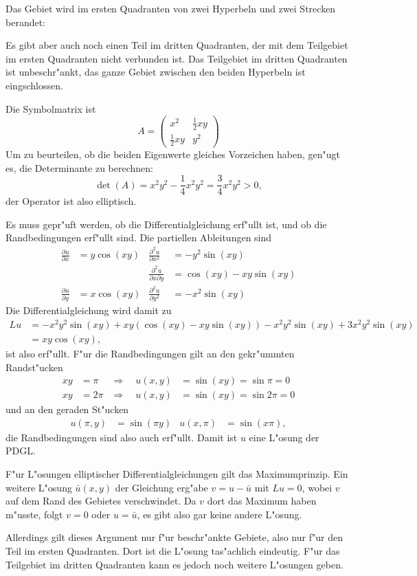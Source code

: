 \begin{loesung}
\begin{teilaufgaben}
\item
Das Gebiet wird im ersten Quadranten von zwei Hyperbeln und zwei Strecken berandet:
\begin{center}
\end{center}
Es gibt aber auch noch einen Teil im dritten Quadranten, der mit dem Teilgebiet
im ersten Quadranten nicht verbunden ist. Das Teilgebiet im
dritten Quadranten ist unbeschr"ankt, das ganze Gebiet zwischen
den beiden Hyperbeln ist eingschlossen.
\item
Die Symbolmatrix ist
\[
A=\begin{pmatrix}
x^2&\frac12xy\\
\frac12xy&y^2
\end{pmatrix}
\]
Um zu beurteilen, ob die beiden Eigenwerte gleiches Vorzeichen haben,
gen"ugt es, die Determinante zu berechnen:
\[
\det(A)=x^2y^2-\frac14x^2y^2=\frac34x^2y^2>0,
\]
der Operator ist also elliptisch.
\item
Es muss gepr"uft werden, ob die Differentialgleichung erf"ullt ist,
und ob die Randbedingungen erf"ullt sind.
Die partiellen Ableitungen sind
\begin{align*}
\frac{\partial u}{\partial x}&=y\cos(xy)
&
\frac{\partial^2 u}{\partial x^2}&=-y^2\sin(xy)
\\
&&\frac{\partial^2 u}{\partial x\partial y}&=\cos(xy)-xy\sin(xy)
\\
\frac{\partial u}{\partial y}&=x\cos(xy)
&
\frac{\partial^2 u}{\partial y^2}&=-x^2\sin(xy)
\end{align*}
Die Differentialgleichung wird damit zu
\begin{align*}
Lu&=-x^2y^2\sin(xy)+xy(\cos(xy)-xy\sin(xy))-x^2y^2\sin(xy)+3x^2y^2\sin(xy)\
\\
&=xy\cos(xy),
\end{align*}
ist also erf"ullt.
F"ur die Randbedingungen gilt an den gekr"ummten Randst"ucken
\begin{align*}
xy&=\pi&\Rightarrow\quad u(x,y)&=\sin(xy)=\sin\pi=0\\
xy&=2\pi&\Rightarrow\quad u(x,y)&=\sin(xy)=\sin2\pi=0
\end{align*}
und an den geraden St"ucken
\begin{align*}
u(\pi,y)&=\sin(\pi y)
&u(x,\pi)&=\sin(x\pi),
\end{align*}
die Randbedingungen
sind also auch erf"ullt. Damit ist $u$ eine L"osung der PDGL.
\item
F"ur L"osungen elliptischer Differentialgleichungen gilt das Maximumprinzip.
Ein weitere L"osung $\bar u(x,y)$ der Gleichung erg"abe
$v=u-\bar u$ mit
$Lu=0$, wobei $v$ auf dem Rand des Gebietes verschwindet.
Da $v$ dort das Maximum haben m"usste, folgt $v=0$ oder $u=\bar u$,
es gibt also gar keine andere L"osung.

Allerdings gilt dieses Argument nur f"ur beschr"ankte Gebiete, also nur
f"ur den Teil im ersten Quadranten. Dort ist die L"osung tas"achlich
eindeutig. F"ur das Teilgebiet im dritten Quadranten kann es
jedoch noch weitere L"osungen geben.
\qedhere
\end{teilaufgaben}
\end{loesung}
